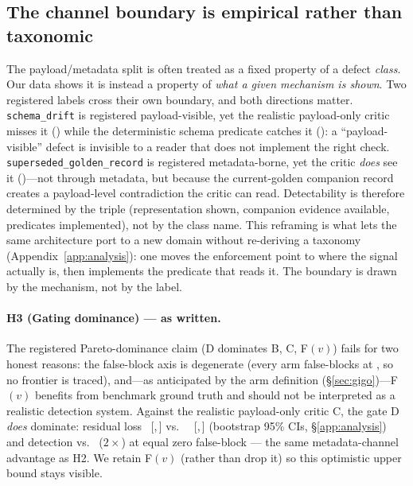 \documentclass[11pt]{article}
\theoremstyle{plain}
\theoremstyle{definition}
\newcommand{\ci}[2]{~{\scriptsize[#1,\,#2]}}
\begin{document}
\subsection{The channel boundary is empirical rather than taxonomic}\label{sec:channel}
The payload/metadata split is often treated as a fixed property of a defect \emph{class}. Our
data shows it is instead a property of \emph{what a given mechanism is shown}. Two registered
labels cross their own boundary, and both directions matter. \texttt{schema\_drift} is
registered payload-visible, yet the realistic payload-only critic misses it (\HtwoDetSchemaC{})
while the deterministic schema predicate catches it (\HtwoDetSchemaG{}): a ``payload-visible''
defect is invisible to a reader that does not implement the right check.
\texttt{superseded\_golden\_record} is registered metadata-borne, yet the critic \emph{does}
see it (\HtwoDetSupersededC{})---not through metadata, but because the current-golden companion
record creates a payload-level contradiction the critic can read. Detectability is therefore
determined by the triple (representation shown, companion evidence available, predicates
implemented), not by the class name. This reframing is what lets the same architecture port to
a new domain without re-deriving a taxonomy (Appendix~\ref{app:analysis}): one moves the
enforcement point to where the signal actually is, then implements the predicate that reads it.
The boundary is drawn by the mechanism, not by the label.

\paragraph{H3 (Gating dominance) --- \ResHthree{} as written.}
The registered Pareto-dominance claim (D dominates B, C, F$(v)$) fails for two honest
reasons: the false-block axis is degenerate (every arm false-blocks at \HthreeFalseBlock{},
so no frontier is traced), and---as anticipated by the arm definition
(\S\ref{sec:gigo})---F$(v)$ benefits from benchmark ground truth and should not be
interpreted as a realistic detection system. Against the realistic payload-only critic C,
the gate D \emph{does} dominate: residual loss \HthreeGateResid{}
\ci{\HthreeGateResidLo}{\HthreeGateResidHi} vs.\ \HthreeCriticResid{}
\ci{\HthreeCriticResidLo}{\HthreeCriticResidHi} (bootstrap 95\% CIs, \S\ref{app:analysis})
and detection \HthreeGateDet{} vs.\ \HthreeCriticDet{} ($2\times$) at equal zero false-block
--- the same metadata-channel advantage as H2. We retain F$(v)$ (rather than drop it) so
this optimistic upper bound stays visible.
\end{document}
